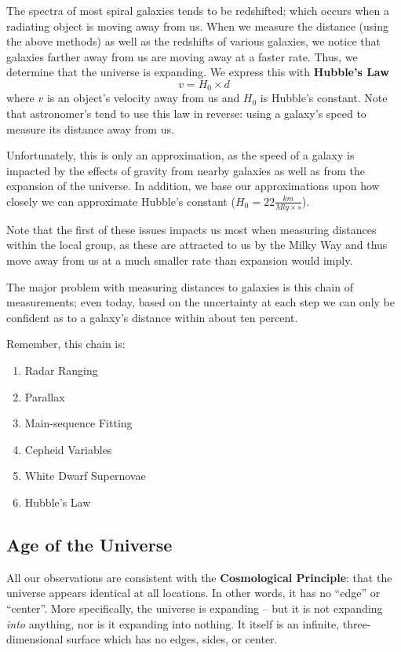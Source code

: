 \documentclass[12pt]{article}
\begin{document}
The spectra of most spiral galaxies tends to be redshifted; which occurs when a radiating object is moving away from us. When we measure the distance (using the above methods) as well as the redshifts of various galaxies, we notice that galaxies farther away from us are moving away at a faster rate. Thus, we determine that the universe is expanding. We express this with {\bf Hubble's Law} \[ v = H_0 \times d \] where $v$ is an object's velocity away from us and $H_0$ is Hubble's constant. Note that astronomer's tend to use this law in reverse: using a galaxy's speed to measure its distance away from us.

Unfortunately, this is only an approximation, as the speed of a galaxy is impacted by the effects of gravity from nearby galaxies as well as from the expansion of the universe. In addition, we base our approximations upon how closely we can approximate Hubble's constant ($H_0 = 22 \frac{km}{Mly \times s}$).

Note that the first of these issues impacts us most when measuring distances within the local group, as these are attracted to us by the Milky Way and thus move away from us at a much smaller rate than expansion would imply.

The major problem with measuring distances to galaxies is this chain of measurements; even today, based on the uncertainty at each step we can only be confident as to a galaxy's distance within about ten percent.

Remember, this chain is:
\begin{enumerate}
\item Radar Ranging
\item Parallax
\item Main-sequence Fitting
\item Cepheid Variables
\item White Dwarf Supernovae
\item Hubble's Law
\end{enumerate}

\subsection{Age of the Universe}
All our observations are consistent with the {\bf Cosmological Principle}: that the universe appears identical at all locations. In other words, it has no ``edge'' or ``center''. More specifically, the universe is expanding -- but it is not expanding \emph{into} anything, nor is it expanding into nothing. It itself is an infinite, three-dimensional surface which has no edges, sides, or center.
\end{document}
